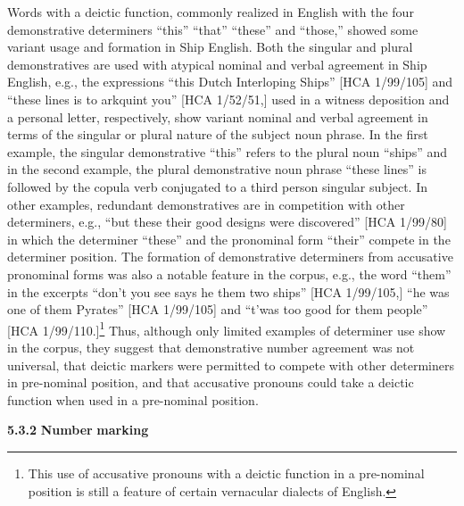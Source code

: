   Words with a deictic function, commonly realized in English with the four demonstrative determiners “this” “that” “these” and “those,” showed some variant usage and formation in Ship English. Both the singular and plural demonstratives are used with atypical nominal and verbal agreement in Ship English, e.g., the expressions “this Dutch Interloping Ships” [HCA 1/99/105] and “these lines is to arkquint you” [HCA 1/52/51,] used in a witness deposition and a personal letter, respectively, show variant nominal and verbal agreement in terms of the singular or plural nature of the subject noun phrase. In the first example, the singular demonstrative “this” refers to the plural noun “ships” and in the second example, the plural demonstrative noun phrase “these lines” is followed by the copula verb conjugated to a third person singular subject. In other examples, redundant demonstratives are in competition with other determiners, e.g., “but these their good designs were discovered” [HCA 1/99/80] in which the determiner “these” and the pronominal form “their” compete in the determiner position. The formation of demonstrative determiners from accusative pronominal forms was also a notable feature in the corpus, e.g., the word “them” in the excerpts “don’t you see says he them two ships” [HCA 1/99/105,] “he was one of them Pyrates” [HCA 1/99/105] and “t’was too good for them people” [HCA 1/99/110.]\footnote{This use of accusative pronouns with a deictic function in a pre-nominal position is still a feature of certain vernacular dialects of English.} Thus, although only limited examples of determiner use show in the corpus, they suggest that demonstrative number agreement was not universal, that deictic markers were permitted to compete with other determiners in pre-nominal position, and that accusative pronouns could take a deictic function when used in a pre-nominal position.  

\textbf{5.3.2} \textbf{Number} \textbf{marking}

